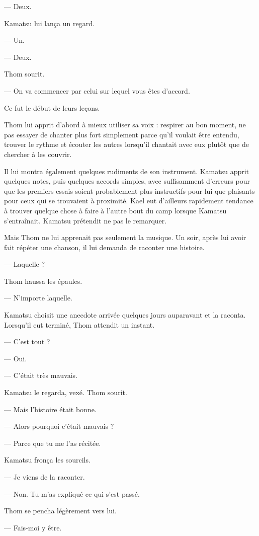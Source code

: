 — Deux.

Kamatsu lui lança un regard.

— Un.

— Deux.

Thom sourit.

— On va commencer par celui sur lequel vous êtes d'accord.

Ce fut le début de leurs leçons.

\scenebreak

Thom lui apprit d'abord à mieux utiliser sa voix : respirer au bon moment, ne
pas essayer de chanter plus fort simplement parce qu'il voulait être entendu,
trouver le rythme et écouter les autres lorsqu'il chantait avec eux plutôt que
de chercher à les couvrir.

Il lui montra également quelques rudiments de son instrument. Kamatsu apprit
quelques notes, puis quelques accords simples, avec suffisamment d'erreurs pour
que les premiers essais soient probablement plus instructifs pour lui que
plaisants pour ceux qui se trouvaient à proximité. Kael eut d'ailleurs
rapidement tendance à trouver quelque chose à faire à l'autre bout du camp
lorsque Kamatsu s'entraînait. Kamatsu prétendit ne pas le remarquer.

Mais Thom ne lui apprenait pas seulement la musique. Un soir, après lui avoir
fait répéter une chanson, il lui demanda de raconter une histoire.

— Laquelle ?

Thom haussa les épaules.

— N'importe laquelle.

Kamatsu choisit une anecdote arrivée quelques jours auparavant et la raconta.
Lorsqu'il eut terminé, Thom attendit un instant.

— C'est tout ?

— Oui.

— C'était très mauvais.

Kamatsu le regarda, vexé. Thom sourit.

— Mais l'histoire était bonne.

— Alors pourquoi c'était mauvais ?

— Parce que tu me l'as récitée.

Kamatsu fronça les sourcils.

— Je viens de la raconter.

— Non. Tu m'as expliqué ce qui s'est passé.

Thom se pencha légèrement vers lui.

— Fais-moi y être.

